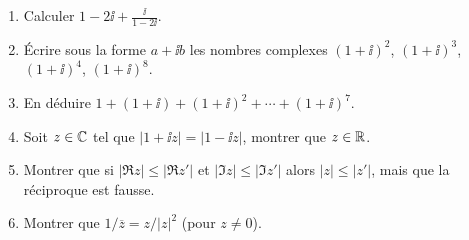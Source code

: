\begin{frame}
\begin{miniexercice}
 \begin{enumerate}
  \setlength{\itemsep}{1em}
  \vspace{1em}
  \item Calculer $1 - 2\ii + \frac{\ii}{1 - 2\ii}$.
  \item \'Ecrire sous la forme $a+\ii b$ les nombres complexes $(1+\ii)^2$,
$(1+\ii)^3$, $(1+\ii)^4$, $(1+\ii)^8$. 
  \item En déduire $1+(1+\ii)+(1+\ii)^2+\cdots +(1+\ii)^7$.
  \item Soit $z\in \mathbb{C}$ tel que $|1+ \ii z| = |1-\ii z|$, montrer que $z \in \mathbb{R}$. 
  \item Montrer que si $|\Re z| \le |\Re z'|$ et $|\Im z| \le |\Im z'|$ alors
$|z| \le |z'|$, mais que la réciproque est fausse.
  \item Montrer que $1 / \overline{z} = z/\left| z \right|^2$ (pour $z\neq 0$).
\end{enumerate}
\end{miniexercice}
\end{frame}



